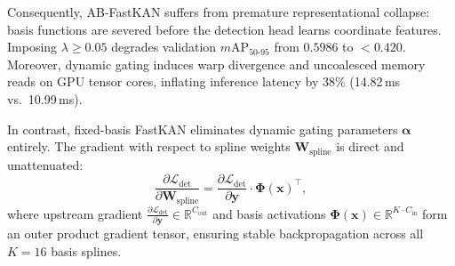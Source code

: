 \documentclass[conference]{IEEEtran}
\begin{document}
Consequently, AB-FastKAN suffers from premature representational collapse: basis functions are severed before the detection head learns coordinate features. Imposing $\lambda \ge 0.05$ degrades validation $m\text{AP}_{50\text{-}95}$ from $0.5986$ to $<0.420$. Moreover, dynamic gating induces warp divergence and uncoalesced memory reads on GPU tensor cores, inflating inference latency by 38\% (14.82\,ms vs.\ 10.99\,ms).

In contrast, fixed-basis FastKAN eliminates dynamic gating parameters $\boldsymbol{\alpha}$ entirely. The gradient with respect to spline weights $\mathbf{W}_{\text{spline}}$ is direct and unattenuated:
\begin{equation}
  \frac{\partial \mathcal{L}_{\text{det}}}{\partial \mathbf{W}_{\text{spline}}} = \frac{\partial \mathcal{L}_{\text{det}}}{\partial \mathbf{y}} \cdot \boldsymbol{\Phi}(\mathbf{x})^\top,
  \label{eq:stable_grad}
\end{equation}
where upstream gradient $\frac{\partial \mathcal{L}_{\text{det}}}{\partial \mathbf{y}} \in \mathbb{R}^{C_{\text{out}}}$ and basis activations $\boldsymbol{\Phi}(\mathbf{x}) \in \mathbb{R}^{K \cdot C_{\text{in}}}$ form an outer product gradient tensor, ensuring stable backpropagation across all $K=16$ basis splines.
\end{document}
